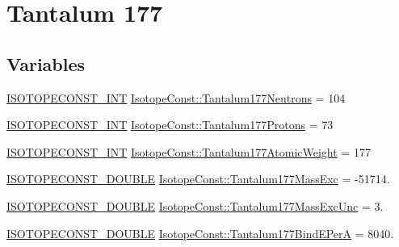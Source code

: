 \hypertarget{group___isotope_const-_tantalum-_ta177}{}\section{Tantalum 177}
\label{group___isotope_const-_tantalum-_ta177}
\subsection*{Variables}
\begin{DoxyCompactItemize}
\item 
\mbox{\hyperlink{group___isotope_const-_macros_ga5f18360b3e99483a35c32d789e62621c}{I\+S\+O\+T\+O\+P\+E\+C\+O\+N\+S\+T\+\_\+\+I\+NT}} \mbox{\hyperlink{group___isotope_const-_tantalum-_ta177_ga0692b132600385064080742b7983e039}{Isotope\+Const\+::\+Tantalum177\+Neutrons}} = 104
\item 
\mbox{\hyperlink{group___isotope_const-_macros_ga5f18360b3e99483a35c32d789e62621c}{I\+S\+O\+T\+O\+P\+E\+C\+O\+N\+S\+T\+\_\+\+I\+NT}} \mbox{\hyperlink{group___isotope_const-_tantalum-_ta177_ga95c05c5f88e604a1634aa3a6477d0a42}{Isotope\+Const\+::\+Tantalum177\+Protons}} = 73
\item 
\mbox{\hyperlink{group___isotope_const-_macros_ga5f18360b3e99483a35c32d789e62621c}{I\+S\+O\+T\+O\+P\+E\+C\+O\+N\+S\+T\+\_\+\+I\+NT}} \mbox{\hyperlink{group___isotope_const-_tantalum-_ta177_ga7d0686d171f354232d662809046b2e6c}{Isotope\+Const\+::\+Tantalum177\+Atomic\+Weight}} = 177
\item 
\mbox{\hyperlink{group___isotope_const-_macros_ga8f45a7272ce02c0b4c65c44636ed719a}{I\+S\+O\+T\+O\+P\+E\+C\+O\+N\+S\+T\+\_\+\+D\+O\+U\+B\+LE}} \mbox{\hyperlink{group___isotope_const-_tantalum-_ta177_ga92ce23afff41b48700008dbc3b910eea}{Isotope\+Const\+::\+Tantalum177\+Mass\+Exc}} = -\/51714.
\item 
\mbox{\hyperlink{group___isotope_const-_macros_ga8f45a7272ce02c0b4c65c44636ed719a}{I\+S\+O\+T\+O\+P\+E\+C\+O\+N\+S\+T\+\_\+\+D\+O\+U\+B\+LE}} \mbox{\hyperlink{group___isotope_const-_tantalum-_ta177_ga5a56c02cd8f9e8b2408fa37b142309d9}{Isotope\+Const\+::\+Tantalum177\+Mass\+Exc\+Unc}} = 3.
\item 
\mbox{\hyperlink{group___isotope_const-_macros_ga8f45a7272ce02c0b4c65c44636ed719a}{I\+S\+O\+T\+O\+P\+E\+C\+O\+N\+S\+T\+\_\+\+D\+O\+U\+B\+LE}} \mbox{\hyperlink{group___isotope_const-_tantalum-_ta177_ga6c317366bb3c755eff2d4ada2dd33762}{Isotope\+Const\+::\+Tantalum177\+Bind\+E\+PerA}} = 8040.
\item 

\end{DoxyCompactItemize}
